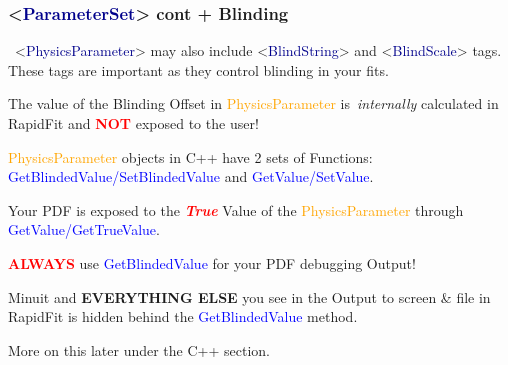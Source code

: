 \documentclass{beamer}
\begin{document}
\begin{frame}
\frametitle{<\textcolor{darkblue}{ParameterSet}> cont + Blinding}

\footnotesize~<\textcolor{darkblue}{PhysicsParameter}> may also include <\textcolor{darkblue}{BlindString}> and <\textcolor{darkblue}{BlindScale}> tags.\newline
These tags are important as they control blinding in your fits.\newline

The value of the Blinding Offset in \textcolor{orange}{PhysicsParameter} is~\textit{internally} calculated in RapidFit and \textcolor{red}{\textbf{NOT}} exposed to the user!\newline\newline

\textcolor{orange}{PhysicsParameter} objects in C++ have 2 sets of Functions:\newline
\textcolor{blue}{GetBlindedValue/SetBlindedValue} and \textcolor{blue}{GetValue/SetValue}.\newline

Your PDF is exposed to the \textcolor{red}{\textit{\textbf{\Large True}}} Value of the \textcolor{orange}{PhysicsParameter} through \textcolor{blue}{GetValue/GetTrueValue}.\newline

\textcolor{red}{\textbf{ALWAYS}} use \textcolor{blue}{GetBlindedValue} for your PDF debugging Output!\newline

Minuit and \textbf{EVERYTHING ELSE} you see in the Output to screen \& file in RapidFit is hidden behind the \textcolor{blue}{GetBlindedValue} method.

\tiny More on this later under the C++ section.

\end{frame}
\end{document}
